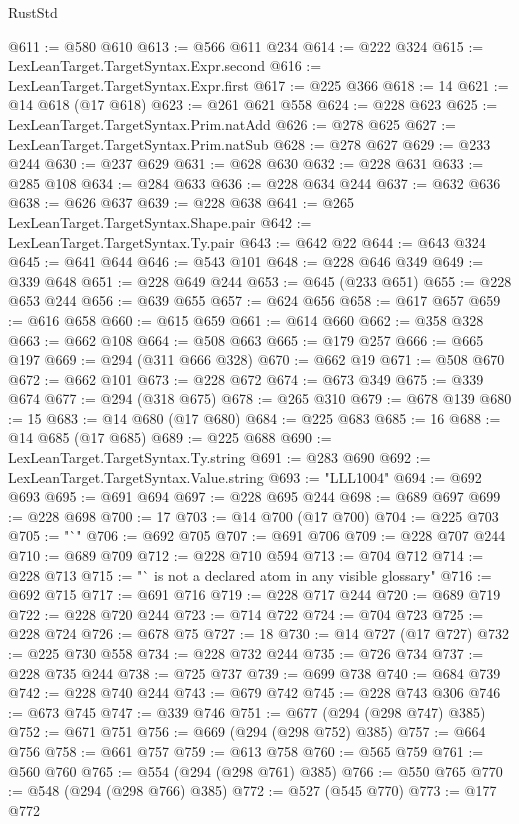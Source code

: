 \begin{lexlean}{RustStd}
\begin{coremodule}
@611 := @580 @610
@613 := @566 @611 @234
@614 := @222 @324
@615 := LexLeanTarget.TargetSyntax.Expr.second
@616 := LexLeanTarget.TargetSyntax.Expr.first
@617 := @225 @366
@618 := 14
@621 := @14 @618 (@17 @618)
@623 := @261 @621 @558
@624 := @228 @623
@625 := LexLeanTarget.TargetSyntax.Prim.natAdd
@626 := @278 @625
@627 := LexLeanTarget.TargetSyntax.Prim.natSub
@628 := @278 @627
@629 := @233 @244
@630 := @237 @629
@631 := @628 @630
@632 := @228 @631
@633 := @285 @108
@634 := @284 @633
@636 := @228 @634 @244
@637 := @632 @636
@638 := @626 @637
@639 := @228 @638
@641 := @265 LexLeanTarget.TargetSyntax.Shape.pair
@642 := LexLeanTarget.TargetSyntax.Ty.pair
@643 := @642 @22
@644 := @643 @324
@645 := @641 @644
@646 := @543 @101
@648 := @228 @646 @349
@649 := @339 @648
@651 := @228 @649 @244
@653 := @645 (@233 @651)
@655 := @228 @653 @244
@656 := @639 @655
@657 := @624 @656
@658 := @617 @657
@659 := @616 @658
@660 := @615 @659
@661 := @614 @660
@662 := @358 @328
@663 := @662 @108
@664 := @508 @663
@665 := @179 @257
@666 := @665 @197
@669 := @294 (@311 @666 @328)
@670 := @662 @19
@671 := @508 @670
@672 := @662 @101
@673 := @228 @672
@674 := @673 @349
@675 := @339 @674
@677 := @294 (@318 @675)
@678 := @265 @310
@679 := @678 @139
@680 := 15
@683 := @14 @680 (@17 @680)
@684 := @225 @683
@685 := 16
@688 := @14 @685 (@17 @685)
@689 := @225 @688
@690 := LexLeanTarget.TargetSyntax.Ty.string
@691 := @283 @690
@692 := LexLeanTarget.TargetSyntax.Value.string
@693 := "LLL1004"
@694 := @692 @693
@695 := @691 @694
@697 := @228 @695 @244
@698 := @689 @697
@699 := @228 @698
@700 := 17
@703 := @14 @700 (@17 @700)
@704 := @225 @703
@705 := "`"
@706 := @692 @705
@707 := @691 @706
@709 := @228 @707 @244
@710 := @689 @709
@712 := @228 @710 @594
@713 := @704 @712
@714 := @228 @713
@715 := "` is not a declared atom in any visible glossary"
@716 := @692 @715
@717 := @691 @716
@719 := @228 @717 @244
@720 := @689 @719
@722 := @228 @720 @244
@723 := @714 @722
@724 := @704 @723
@725 := @228 @724
@726 := @678 @75
@727 := 18
@730 := @14 @727 (@17 @727)
@732 := @225 @730 @558
@734 := @228 @732 @244
@735 := @726 @734
@737 := @228 @735 @244
@738 := @725 @737
@739 := @699 @738
@740 := @684 @739
@742 := @228 @740 @244
@743 := @679 @742
@745 := @228 @743 @306
@746 := @673 @745
@747 := @339 @746
@751 := @677 (@294 (@298 @747) @385)
@752 := @671 @751
@756 := @669 (@294 (@298 @752) @385)
@757 := @664 @756
@758 := @661 @757
@759 := @613 @758
@760 := @565 @759
@761 := @560 @760
@765 := @554 (@294 (@298 @761) @385)
@766 := @550 @765
@770 := @548 (@294 (@298 @766) @385)
@772 := @527 (@545 @770)
@773 := @177 @772

\end{coremodule}
\end{lexlean}
